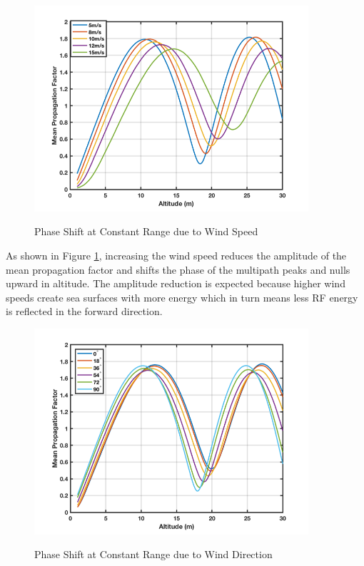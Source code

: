 \begin{figure}[H]
  \begin{center}
\includegraphics[width=4in]{../media/statistics/phase_shift_wind_speed.png}
  \end{center}
  \renewcommand{\baselinestretch}{1} \small\normalsize
  \begin{quote}
    \caption[Phase Shift at Constant Range due to Wind Speed]{Phase Shift at Constant Range due to Wind Speed\label{stat_fig:2zz}}
  \end{quote}
\end{figure}
\renewcommand{\baselinestretch}{2} \small\normalsize

As shown in Figure \ref{stat_fig:2zz}, increasing the wind speed reduces the amplitude of the mean propagation factor and shifts the phase of the multipath peaks and nulls upward in altitude. The amplitude reduction is expected because higher wind speeds create sea surfaces with more energy which in turn means less RF energy is reflected in the forward direction.

\begin{figure}[H]
  \begin{center}
\includegraphics[width=4in]{../media/statistics/phase_shift_wind_direction.png}
  \end{center}
  \renewcommand{\baselinestretch}{1} \small\normalsize
  \begin{quote}
    \caption[Phase Shift at Constant Range due to Wind Direction]{Phase Shift at Constant Range due to Wind Direction\label{stat_fig:2zzz}}
  \end{quote}
\end{figure}
\renewcommand{\baselinestretch}{2} \small\normalsize

